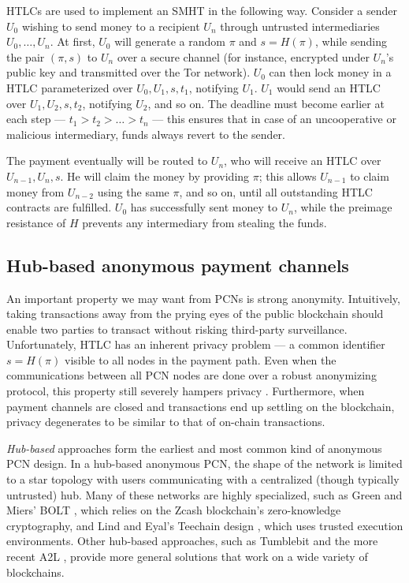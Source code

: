 \documentclass[USenglish,oneside,twocolumn]{article}
\begin{document}
HTLCs are used to implement an SMHT in the following way. Consider a sender $U_0$ wishing to send money to a recipient $U_n$ through untrusted intermediaries $U_0,\dots,U_n$. At first, $U_0$ will generate a random $\pi$ and $s=H(\pi)$, while sending the pair $(\pi,s)$ to $U_n$ over a secure channel (for instance, encrypted under $U_n$'s public key and transmitted over the Tor \cite{dingledine2004tor} network). $U_0$ can then lock money in a HTLC parameterized over $U_0,U_1,s,t_1$, notifying $U_1$. $U_1$ would send an HTLC over $U_1,U_2,s,t_2$, notifying $U_2$, and so on. The deadline must become earlier at each step --- $t_1>t_2>\dots>t_n$ --- this ensures that in case of an uncooperative or malicious intermediary, funds always revert to the sender.

The payment eventually will be routed to $U_n$, who will receive an HTLC over $U_{n-1},U_n,s$. He will claim the money by providing $\pi$; this allows $U_{n-1}$ to claim money from $U_{n-2}$ using the same $\pi$, and so on, until all outstanding HTLC contracts are fulfilled. $U_0$ has successfully sent money to $U_n$, while the preimage resistance of $H$ prevents any intermediary from stealing the funds.

\subsection{Hub-based anonymous payment channels}

An important property we may want from PCNs is strong anonymity. Intuitively, taking transactions away from the prying eyes of the public blockchain should enable two parties to transact without risking third-party surveillance. Unfortunately, HTLC has an inherent privacy problem --- a common identifier $s=H(\pi)$ visible to all nodes in the payment path. Even when the communications between all PCN nodes are done over a robust anonymizing protocol, this property still severely hampers privacy \cite{green2017bolt,malavolta2017concurrency,malavolta2019anonymous}. Furthermore, when payment channels are closed and transactions end up settling on the blockchain, privacy degenerates to be similar to that of on-chain transactions.

\emph{Hub-based} approaches form the earliest and most common kind of anonymous PCN design. In a hub-based anonymous PCN, the shape of the network is limited to a star topology with users communicating with a centralized (though typically untrusted) hub. Many of these networks are highly specialized, such as Green and Miers' BOLT \cite{green2017bolt}, which relies on the Zcash blockchain's zero-knowledge cryptography, and Lind and Eyal's Teechain design \cite{lind2016teechan}, which uses trusted execution environments. Other hub-based approaches, such as Tumblebit \cite{heilman2017tumblebit} and the more recent A2L \cite{tairi2019a2l}, provide more general solutions that work on a wide variety of blockchains.
\end{document}
